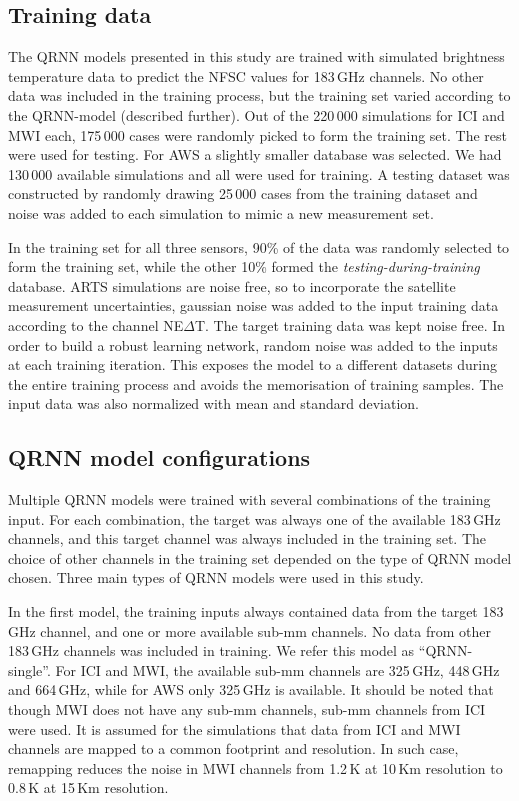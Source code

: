 \documentclass[amt, manuscript]{copernicus}
\begin{document}
\subsection{Training data}
%
The QRNN models presented in this study are trained with simulated brightness temperature data to predict the NFSC values for 183\,GHz channels. No other data was included in the training process, but the training set varied according to the QRNN-model (described further). Out of the 220\,000 simulations for ICI and MWI each, 175\,000 cases were randomly picked to form the training set. The rest were used for testing. For AWS a slightly smaller database was selected. We had 130\,000 available simulations and all were used for training. A testing dataset was constructed by randomly drawing 25\,000 cases from the training dataset and noise was added to each simulation to mimic a new measurement set. 

In the training set for all three sensors, 90\% of the data was randomly selected to form the training set, while the other 10\% formed the \textit{testing-during-training} database. ARTS simulations are noise free, so to incorporate the satellite measurement uncertainties, gaussian noise was added to the input training data according to the channel NE$\Delta$T. The target training data was kept noise free. In order to build a robust learning network, random noise was added to the inputs at each training iteration. This exposes the model to a different datasets during the entire training process and avoids the memorisation of training samples. The input data was also normalized with mean and standard deviation.  

\subsection{QRNN model configurations}
%
\label{QRNN_models}
Multiple QRNN models were trained with several combinations of the training input. For each combination, the target was always one of the available 183\,GHz channels, and this target channel was always included in the training set. The choice of other channels in the training set depended on the type of QRNN model chosen. Three main types of QRNN models were used in this study. 

In the first model, the training inputs always contained data from the target 183\,GHz channel, and one or more available sub-mm channels. No data from other 183\,GHz channels was included in training. We refer this model as ``QRNN-single''. For ICI and MWI, the available sub-mm channels are 325\,GHz, 448\,GHz and 664\,GHz, while for AWS only 325\,GHz is available. It should be noted that though MWI does not have any sub-mm channels,  sub-mm channels from ICI were used. It is assumed for the simulations that data from ICI and MWI channels are mapped to a common footprint and resolution. In such case, remapping reduces the noise in MWI channels from 1.2\,K at 10\,Km resolution to 0.8\,K at 15\,Km resolution. 
 
\end{document}
